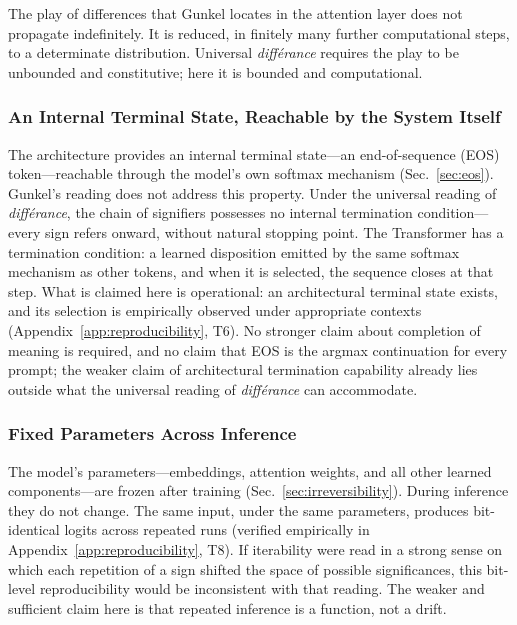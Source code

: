 \documentclass[a4paper,twocolumn,11pt]{article}
\begin{document}
The play of differences that Gunkel locates in the attention layer does not propagate indefinitely. It is reduced, in finitely many further computational steps, to a determinate distribution. Universal \emph{diff\'erance} requires the play to be unbounded and constitutive; here it is bounded and computational.

\subsubsection{An Internal Terminal State, Reachable by the System Itself}

The architecture provides an internal terminal state---an end-of-sequence (EOS) token---reachable through the model's own softmax mechanism (Sec.~\ref{sec:eos}). Gunkel's reading does not address this property. Under the universal reading of \emph{diff\'erance}, the chain of signifiers possesses no internal termination condition---every sign refers onward, without natural stopping point. The Transformer has a termination condition: a learned disposition emitted by the same softmax mechanism as other tokens, and when it is selected, the sequence closes at that step. What is claimed here is operational: an architectural terminal state exists, and its selection is empirically observed under appropriate contexts (Appendix~\ref{app:reproducibility}, T6). No stronger claim about completion of meaning is required, and no claim that EOS is the argmax continuation for every prompt; the weaker claim of architectural termination capability already lies outside what the universal reading of \emph{diff\'erance} can accommodate.

\subsubsection{Fixed Parameters Across Inference}

The model's parameters---embeddings, attention weights, and all other learned components---are frozen after training (Sec.~\ref{sec:irreversibility}). During inference they do not change. The same input, under the same parameters, produces bit-identical logits across repeated runs (verified empirically in Appendix~\ref{app:reproducibility}, T8). If iterability were read in a strong sense on which each repetition of a sign shifted the space of possible significances, this bit-level reproducibility would be inconsistent with that reading. The weaker and sufficient claim here is that repeated inference is a function, not a drift.
\end{document}
